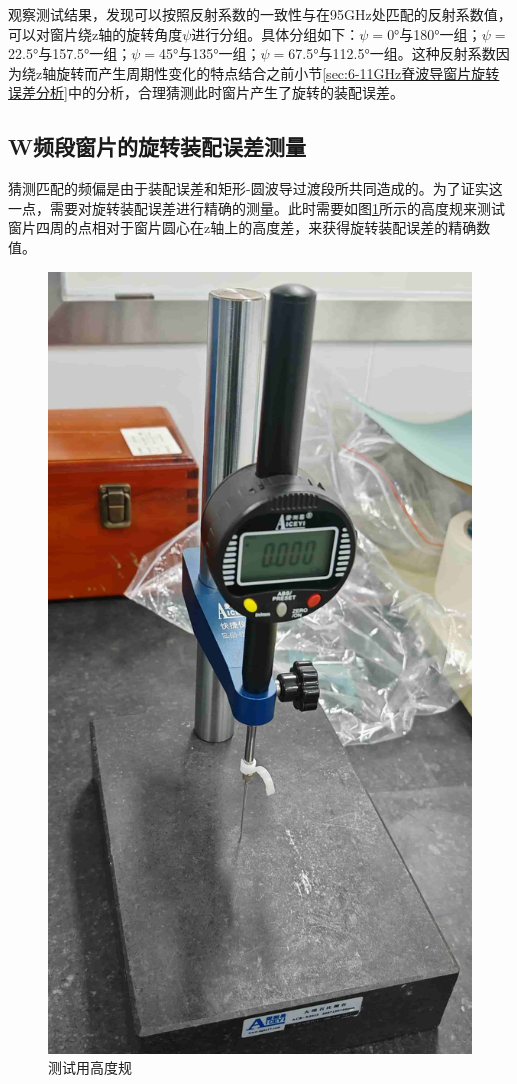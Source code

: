 \documentclass[master]{thesis-uestc}
\begin{document}
观察测试结果，发现可以按照反射系数的一致性与在95GHz处匹配的反射系数值，可以对窗片绕z轴的旋转角度\(\psi\)进行分组。具体分组如下：\(\psi=\)0°与180°一组；\(\psi=\)22.5°与157.5°一组；\(\psi=\)45°与135°一组；\(\psi=\)67.5°与112.5°一组。这种反射系数因为绕z轴旋转而产生周期性变化的特点结合之前小节\ref{sec:6-11GHz脊波导窗片旋转误差分析}中的分析，合理猜测此时窗片产生了旋转的装配误差。

\subsection{W频段窗片的旋转装配误差测量}
猜测匹配的频偏是由于装配误差和矩形-圆波导过渡段所共同造成的。为了证实这一点，需要对旋转装配误差进行精确的测量。此时需要如图\ref{fig:高度规}所示的高度规来测试窗片四周的点相对于窗片圆心在z轴上的高度差，来获得旋转装配误差的精确数值。
\begin{figure}[!htb]
    \centering
    \includegraphics[width=0.17\linewidth]{pic/chapter5/高度规.jpg}
    \caption{测试用高度规}
    \label{fig:高度规}
\end{figure}
\end{document}
